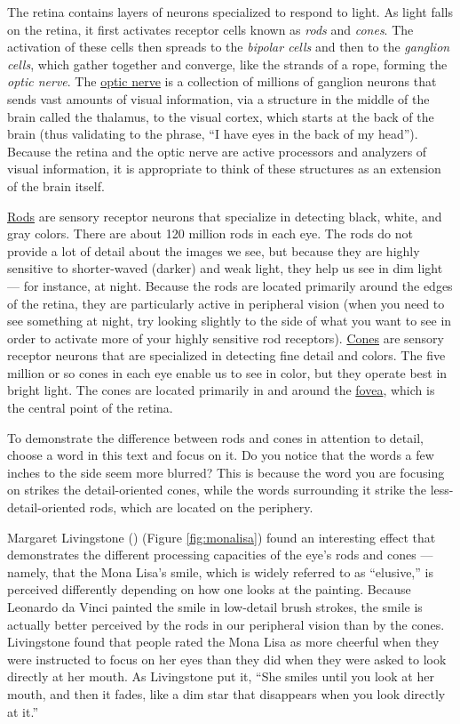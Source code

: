 \documentclass[
]{krantz}
\begin{document}
The retina contains layers of neurons specialized to respond to light. As light falls on the retina, it first activates receptor cells known as \emph{rods} and \emph{cones}. The activation of these cells then spreads to the \emph{bipolar cells} and then to the \emph{ganglion cells}, which gather together and converge, like the strands of a rope, forming the \emph{optic nerve}. The \hyperref[optic-nerve]{optic nerve} is a collection of millions of ganglion neurons that sends vast amounts of visual information, via a structure in the middle of the brain called the thalamus, to the visual cortex, which starts at the back of the brain (thus validating to the phrase, ``I have eyes in the back of my head''). Because the retina and the optic nerve are active processors and analyzers of visual information, it is appropriate to think of these structures as an extension of the brain itself.

\hyperref[rods]{Rods} are sensory receptor neurons that specialize in detecting black, white, and gray colors. There are about 120 million rods in each eye. The rods do not provide a lot of detail about the images we see, but because they are highly sensitive to shorter-waved (darker) and weak light, they help us see in dim light --- for instance, at night. Because the rods are located primarily around the edges of the retina, they are particularly active in peripheral vision (when you need to see something at night, try looking slightly to the side of what you want to see in order to activate more of your highly sensitive rod receptors). \hyperref[cones]{Cones} are sensory receptor neurons that are specialized in detecting fine detail and colors. The five million or so cones in each eye enable us to see in color, but they operate best in bright light. The cones are located primarily in and around the \hyperref[fovea]{fovea}, which is the central point of the retina.

To demonstrate the difference between rods and cones in attention to detail, choose a word in this text and focus on it. Do you notice that the words a few inches to the side seem more blurred? This is because the word you are focusing on strikes the detail-oriented cones, while the words surrounding it strike the less-detail-oriented rods, which are located on the periphery.

Margaret Livingstone () (Figure \ref{fig:monalisa}) found an interesting effect that demonstrates the different processing capacities of the eye's rods and cones --- namely, that the Mona Lisa's smile, which is widely referred to as ``elusive,'' is perceived differently depending on how one looks at the painting. Because Leonardo da Vinci painted the smile in low-detail brush strokes, the smile is actually better perceived by the rods in our peripheral vision than by the cones. Livingstone found that people rated the Mona Lisa as more cheerful when they were instructed to focus on her eyes than they did when they were asked to look directly at her mouth. As Livingstone put it, ``She smiles until you look at her mouth, and then it fades, like a dim star that disappears when you look directly at it.''
\end{document}
